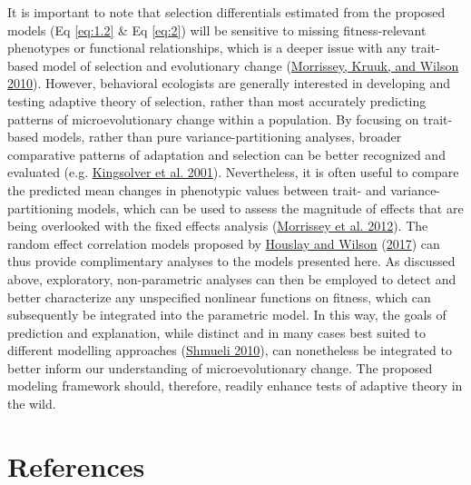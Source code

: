 \documentclass{article}
\begin{document}
It is important to note that selection differentials estimated from the
proposed models (Eq \ref{eq:1.2} \& Eq \ref{eq:2}) will be sensitive to
missing fitness-relevant phenotypes or functional relationships, which
is a deeper issue with any trait-based model of selection and
evolutionary change (\protect\hyperlink{ref-Morrissey2010}{Morrissey,
Kruuk, and Wilson 2010}). However, behavioral ecologists are generally
interested in developing and testing adaptive theory of selection,
rather than most accurately predicting patterns of microevolutionary
change within a population. By focusing on trait-based models, rather
than pure variance-partitioning analyses, broader comparative patterns
of adaptation and selection can be better recognized and evaluated (e.g.
\protect\hyperlink{ref-Kingsolver2001}{Kingsolver et al. 2001}).
Nevertheless, it is often useful to compare the predicted mean changes
in phenotypic values between trait- and variance-partitioning models,
which can be used to assess the magnitude of effects that are being
overlooked with the fixed effects analysis
(\protect\hyperlink{ref-Morrissey2012}{Morrissey et al. 2012}). The
random effect correlation models proposed by
\protect\hyperlink{ref-Hous2017}{Houslay and Wilson}
(\protect\hyperlink{ref-Hous2017}{2017}) can thus provide complimentary
analyses to the models presented here. As discussed above, exploratory,
non-parametric analyses can then be employed to detect and better
characterize any unspecified nonlinear functions on fitness, which can
subsequently be integrated into the parametric model. In this way, the
goals of prediction and explanation, while distinct and in many cases
best suited to different modelling approaches
(\protect\hyperlink{ref-Shmueli2010}{Shmueli 2010}), can nonetheless be
integrated to better inform our understanding of microevolutionary
change. The proposed modeling framework should, therefore, readily
enhance tests of adaptive theory in the wild.

\pagebreak

\hypertarget{references}{%
\section*{References}\label{references}}
\end{document}
